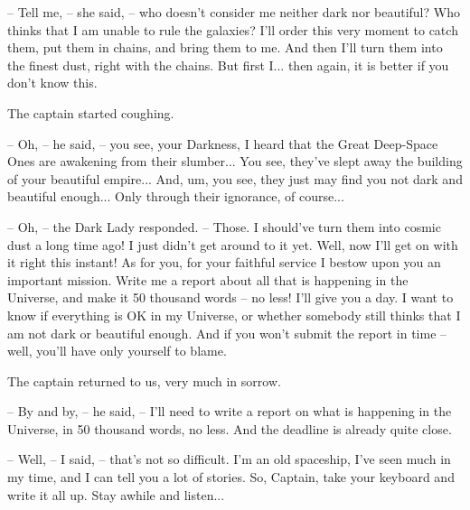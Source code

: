 \documentclass[ebook,twoside,final,openright]{memoir}
\begin{document}
– Tell me, – she said, – who doesn’t consider me neither dark nor beautiful? Who thinks that I am unable to rule the galaxies? I’ll order this very moment to catch them, put them in chains, and bring them to me. And then I’ll turn them into the finest dust, right with the chains. But first I... then again, it is better if you don’t know this.\par
The captain started coughing.\par
– Oh, – he said, – you see, your Darkness, I heard that the Great Deep-Space Ones are awakening from their slumber... You see, they’ve slept away the building of your beautiful empire... And, um, you see, they just may find you not dark and beautiful enough... Only through their ignorance, of course...\par
– Oh, – the Dark Lady responded. – Those. I should’ve turn them into cosmic dust a long time ago! I just didn’t get around to it yet. Well, now I’ll get on with it right this instant! As for you, for your faithful service I bestow upon you an important mission. Write me a report about all that is happening in the Universe, and make it 50 thousand words – no less! I’ll give you a day. I want to know if everything is OK in my Universe, or whether somebody still thinks that I am not dark or beautiful enough. And if you won’t submit the report in time – well, you’ll have only yourself to blame.\par
\par
The captain returned to us, very much in sorrow.\par
– By and by, – he said, – I’ll need to write a report on what is happening in the Universe, in 50 thousand words, no less. And the deadline is already quite close.\par
– Well, – I said, – that’s not so difficult. I'm an old spaceship, I’ve seen much in my time, and I can tell you a lot of stories. So, Captain, take your keyboard and write it all up. Stay awhile and listen...
\end{document}
